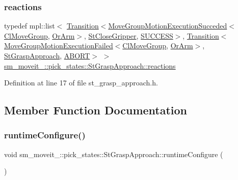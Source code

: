 \subsubsection{\texorpdfstring{reactions}{reactions}}
{\footnotesize\ttfamily typedef mpl\+::list$<$ \hyperlink{classsmacc_1_1Transition}{Transition}$<$\hyperlink{structmoveit__z__client_1_1MoveGroupMotionExecutionSucceded}{Move\+Group\+Motion\+Execution\+Succeded}$<$\hyperlink{classmoveit__z__client_1_1ClMoveGroup}{Cl\+Move\+Group}, \hyperlink{classsm__moveit__4_1_1OrArm}{Or\+Arm}$>$, \hyperlink{structsm__moveit__4_1_1pick__states_1_1StCloseGripper}{St\+Close\+Gripper}, \hyperlink{structsmacc_1_1default__transition__tags_1_1SUCCESS}{S\+U\+C\+C\+E\+SS}$>$, \hyperlink{classsmacc_1_1Transition}{Transition}$<$\hyperlink{structmoveit__z__client_1_1MoveGroupMotionExecutionFailed}{Move\+Group\+Motion\+Execution\+Failed}$<$\hyperlink{classmoveit__z__client_1_1ClMoveGroup}{Cl\+Move\+Group}, \hyperlink{classsm__moveit__4_1_1OrArm}{Or\+Arm}$>$, \hyperlink{structsm__moveit__4_1_1pick__states_1_1StGraspApproach}{St\+Grasp\+Approach}, \hyperlink{structsmacc_1_1default__transition__tags_1_1ABORT}{A\+B\+O\+RT}$>$ $>$ \hyperlink{structsm__moveit__4_1_1pick__states_1_1StGraspApproach_a1c95028174302ddacbd6e793098a50a3}{sm\+\_\+moveit\+\_\+::pick\+\_\+states\+::\+St\+Grasp\+Approach\+::reactions}}



Definition at line 17 of file st\+\_\+grasp\+\_\+approach.\+h.



\subsection{Member Function Documentation}
\mbox{\label{structsm__moveit__4_1_1pick__states_1_1StGraspApproach_a720bc0cdf90f16b038c22fdb717bb3a7}} 
\subsubsection{\texorpdfstring{runtime\+Configure()}{runtimeConfigure()}}
{\footnotesize\ttfamily void sm\+\_\+moveit\+\_\+::pick\+\_\+states\+::\+St\+Grasp\+Approach\+::runtime\+Configure (\begin{DoxyParamCaption}{ }\end{DoxyParamCaption})\hspace{0.3cm}{\ttfamily [inline]}}



